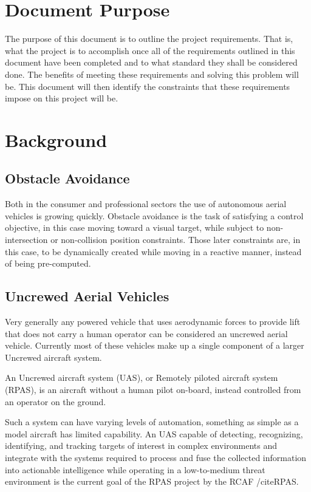 \documentclass[]{report}
\begin{document}
\section{Document Purpose}

The purpose of this document is to outline the project requirements. That is, what the project is to accomplish once all of the requirements outlined in this document have been completed and to what standard they shall be considered done. The benefits of meeting these requirements and solving this problem will be. This document will then identify the constraints that these requirements impose on this project will be.

\section{Background}

\subsection{Obstacle Avoidance}

Both in the consumer and professional sectors the use of autonomous aerial vehicles is growing quickly. 
Obstacle avoidance is the task of satisfying a control objective, in this case moving toward a visual target, while subject to non-intersection or non-collision position constraints. Those later constraints are, in this case, to be dynamically created while moving in a reactive manner, instead of being pre-computed.

\subsection{Uncrewed Aerial Vehicles}

Very generally any powered vehicle that uses aerodynamic forces to provide lift that does not carry a human operator can be considered an uncrewed aerial vehicle. Currently most of these vehicles make up a single component of a larger Uncrewed aircraft system. 

An Uncrewed aircraft system (UAS), or Remotely piloted aircraft system (RPAS), is an aircraft without a human pilot on-board, instead controlled from an operator on the ground. 

Such a system can have varying levels of automation, something as simple as a model aircraft has limited capability. An UAS capable of detecting, recognizing, identifying, and tracking targets of interest in complex environments and integrate with the systems required to process and fuse the collected information into actionable intelligence while operating in a low-to-medium threat environment is the current goal of the RPAS project by the RCAF /cite{RPAS}. 
\end{document}

